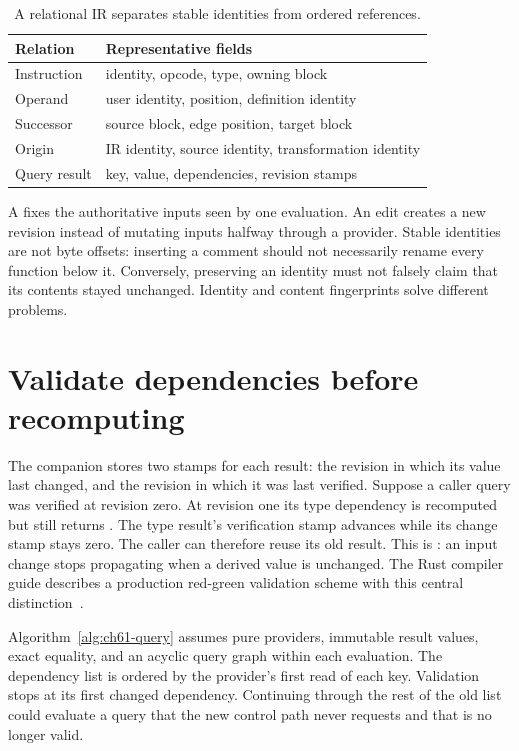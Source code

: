 \begin{table}[htbp]
\caption{A relational IR separates stable identities from ordered references.}
\label{tab:ch61-schema}
\centering
\begin{tabular}{ll}
\toprule
Relation & Representative fields \\
\midrule
Instruction & identity, opcode, type, owning block \\
Operand & user identity, position, definition identity \\
Successor & source block, edge position, target block \\
Origin & IR identity, source identity, transformation identity \\
Query result & key, value, dependencies, revision stamps \\
\bottomrule
\end{tabular}
\end{table}

A  fixes the authoritative inputs seen by one evaluation.
An edit creates a new revision instead of mutating inputs halfway through a provider.
Stable identities are not byte offsets: inserting a comment should not necessarily rename every function below it.
Conversely, preserving an identity must not falsely claim that its contents stayed unchanged.
Identity and content fingerprints solve different problems.

\section{Validate dependencies before recomputing}
\label{sec:ch61-validation}

The companion stores two stamps for each result: the revision in which its value last changed, and the revision in which it was last verified.
Suppose a caller query was verified at revision zero.
At revision one its type dependency is recomputed but still returns .
The type result's verification stamp advances while its change stamp stays zero.
The caller can therefore reuse its old result.
This is : an input change stops propagating when a derived value is unchanged.
The Rust compiler guide describes a production red-green validation scheme with this central distinction~\cite{rust-2026-incremental}.

Algorithm~\ref{alg:ch61-query} assumes pure providers, immutable result values, exact equality, and an acyclic query graph within each evaluation.
The dependency list is ordered by the provider's first read of each key.
Validation stops at its first changed dependency.
Continuing through the rest of the old list could evaluate a query that the new control path never requests and that is no longer valid.

